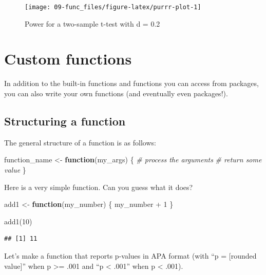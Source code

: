 \documentclass[
  oneside]{book}
\newenvironment{Shaded}{\begin{snugshade}}{\end{snugshade}}
\newcommand{\CommentTok}[1]{\textcolor[rgb]{0.56,0.35,0.01}{\textit{#1}}}
\newcommand{\ControlFlowTok}[1]{\textcolor[rgb]{0.13,0.29,0.53}{\textbf{#1}}}
\newcommand{\DecValTok}[1]{\textcolor[rgb]{0.00,0.00,0.81}{#1}}
\newcommand{\FunctionTok}[1]{\textcolor[rgb]{0.00,0.00,0.00}{#1}}
\newcommand{\NormalTok}[1]{#1}
\newcommand{\OtherTok}[1]{\textcolor[rgb]{0.56,0.35,0.01}{#1}}
\newcommand{\SpecialCharTok}[1]{\textcolor[rgb]{0.00,0.00,0.00}{#1}}
\begin{document}
\begin{figure}

{\centering \texttt{[image: 09-func\_files/figure-latex/purrr-plot-1]} 

}

\caption{Power for a two-sample t-test with d = 0.2}\label{fig:purrr-plot}
\end{figure}

\hypertarget{custom-functions}{%
\section{Custom functions}\label{custom-functions}}

In addition to the built-in functions and functions you can access from packages, you can also write your own functions (and eventually even packages!).

\hypertarget{structure-function}{%
\subsection{Structuring a function}\label{structure-function}}

The general structure of a function is as follows:

\begin{Shaded}
\begin{Highlighting}[]
\NormalTok{function\_name }\OtherTok{\textless{}{-}} \ControlFlowTok{function}\NormalTok{(my\_args) \{}
  \CommentTok{\# process the arguments}
  \CommentTok{\# return some value}
\NormalTok{\}}
\end{Highlighting}
\end{Shaded}

Here is a very simple function. Can you guess what it does?

\begin{Shaded}
\begin{Highlighting}[]
\NormalTok{add1 }\OtherTok{\textless{}{-}} \ControlFlowTok{function}\NormalTok{(my\_number) \{}
\NormalTok{  my\_number }\SpecialCharTok{+} \DecValTok{1}
\NormalTok{\}}

\FunctionTok{add1}\NormalTok{(}\DecValTok{10}\NormalTok{)}
\end{Highlighting}
\end{Shaded}

\begin{verbatim}
## [1] 11
\end{verbatim}

Let's make a function that reports p-values in APA format (with ``p = {[}rounded value{]}'' when p \textgreater= .001 and ``p \textless{} .001'' when p \textless{} .001).
\end{document}
